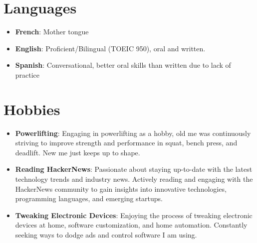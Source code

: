 \documentclass[letterpaper,11pt]{article}
\newcommand{\resumeItem}[2]{
  \item\small{
    \textbf{#1}{: #2 \vspace{-2pt}}
  }
}
\newcommand{\resumeSubItem}[2]{\resumeItem{#1}{#2}\vspace{-4pt}}
\newcommand{\resumeSubHeadingListStart}{\begin{itemize}[leftmargin=*]}
\newcommand{\resumeSubHeadingListEnd}{\end{itemize}}
\begin{document}
\section{Languages}
 \resumeSubHeadingListStart
   \item{
     \textbf{French}{: Mother tongue}}
     \item{
     \textbf{English}{: Proficient/Bilingual (TOEIC 950), oral and written.}
     }
     \item{
     \textbf{Spanish}{: Conversational, better oral skills than written due to lack of practice}
     }
 \resumeSubHeadingListEnd

\section{Hobbies}
\resumeSubHeadingListStart
\resumeSubItem{Powerlifting}
{Engaging in powerlifting as a hobby, old me was continuously striving to improve strength and performance in squat, bench press, and deadlift. New me just keeps up to shape.}
\resumeSubItem{Reading HackerNews}
{Passionate about staying up-to-date with the latest technology trends and industry news. Actively reading and engaging with the HackerNews community to gain insights into innovative technologies, programming languages, and emerging startups.}
\resumeSubItem{Tweaking Electronic Devices}
{Enjoying the process of tweaking electronic devices at home, software customization, and home automation. Constantly seeking ways to dodge ads and control software I am using.}
\resumeSubHeadingListEnd
\end{document}

